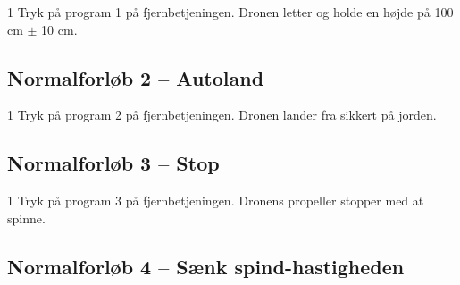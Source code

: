 \documentclass[Main]{subfiles}
\begin{document}
\begin{TestCase}
\TC
{1}
{Tryk på program 1 på fjernbetjeningen.}
{Dronen letter og holde en højde på 100 cm $\pm$ 10 cm.}
{}
\end{TestCase}





\subsection*{Normalforløb 2 -- Autoland}

\begin{TestCaseIntro}
\end{TestCaseIntro}

\begin{TestCase}
\TC
{1}
{Tryk på program 2 på fjernbetjeningen.}
{Dronen lander fra sikkert på jorden.}
{}
\end{TestCase}




\subsection*{Normalforløb 3 -- Stop}

\begin{TestCaseIntro}
\end{TestCaseIntro}

\begin{TestCase}
\TC
{1}
{Tryk på program 3 på fjernbetjeningen.}
{Dronens propeller stopper med at spinne.}
{}
\end{TestCase}




\newpage
\subsection*{Normalforløb 4 -- Sænk spind-hastigheden}

\begin{TestCaseIntro}
\end{TestCaseIntro}
\end{document}
